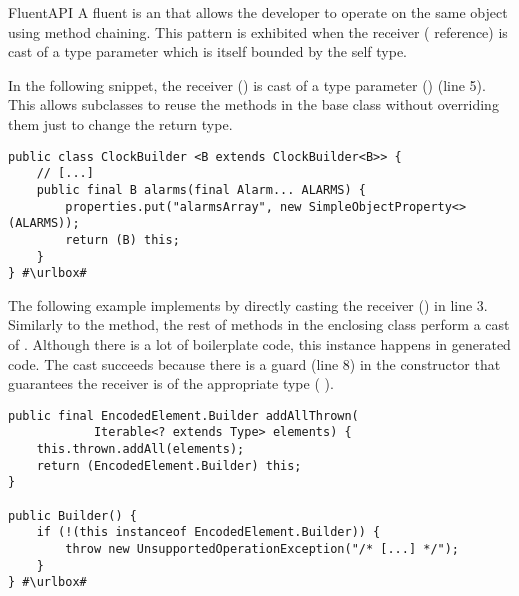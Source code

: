 \begin{pattern}{FluentAPI}
A fluent \api{} is an \api{} that allows the developer to operate on the same
object using method chaining.
This pattern is exhibited when the receiver ( reference) is cast of a type parameter which is itself bounded by the self type.


\instances{}
In the following snippet,
the receiver () is cast of a type parameter () (line 5).
This allows subclasses to reuse the methods in the base class without overriding them just to change the return type.

\def\urlvar{http://bit.ly/HanSolo_Medusa_2TyBObH}
\begin{verbatim}
public class ClockBuilder <B extends ClockBuilder<B>> {
    // [...]
    public final B alarms(final Alarm... ALARMS) {
        properties.put("alarmsArray", new SimpleObjectProperty<>(ALARMS));
        return (B) this;
    }
} #\urlbox#
\end{verbatim}

The following example implements \thisp{} by directly casting the receiver
() in line 3.
Similarly to the  method,
the rest of methods in the enclosing class perform a cast of .
Although there is a lot of boilerplate code,
this instance happens in generated code.
The cast succeeds because there is a guard (line 8) in the constructor that 
guarantees the receiver is of the appropriate type (\cf{} ).

\def\urlvar{http://bit.ly/immutables_immutables_2S4BoJs}
\begin{verbatim}
public final EncodedElement.Builder addAllThrown(
            Iterable<? extends Type> elements) {
    this.thrown.addAll(elements);
    return (EncodedElement.Builder) this;
}

public Builder() {
    if (!(this instanceof EncodedElement.Builder)) {
        throw new UnsupportedOperationException("/* [...] */");
    }
} #\urlbox#
\end{verbatim}



\end{pattern}
